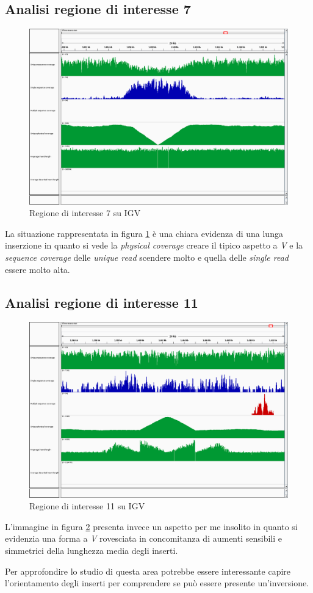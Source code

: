 \subsection{Analisi regione di interesse 7}
\begin{figure}[htbp]
\centering
\includegraphics[width=.45\textwidth]{immagini/igv_regione7.png}
\caption{Regione di interesse 7 su IGV}
\label{fig:regione 7}
\end{figure}

La situazione rappresentata in figura \ref{fig:regione 7} è una chiara evidenza di una lunga inserzione in quanto si vede la \emph{physical coverage} creare il tipico aspetto a \emph{V} e la \emph{sequence coverage} delle \emph{unique read} scendere molto e quella delle \emph{single read} essere molto alta.

\subsection{Analisi regione di interesse 11}
\begin{figure}[htbp]
\centering
\includegraphics[width=.45\textwidth]{immagini/igv_regione11.png}
\caption{Regione di interesse 11 su IGV}
\label{fig:regioni 11}
\end{figure}

L'immagine in figura \ref{fig:regioni 11} presenta invece un aspetto per me insolito in quanto si evidenzia una forma a \emph{V} rovesciata in concomitanza di aumenti sensibili e simmetrici della lunghezza media degli inserti.

Per approfondire lo studio di questa area potrebbe essere interessante capire l'orientamento degli inserti per comprendere se può essere presente un'inversione.

